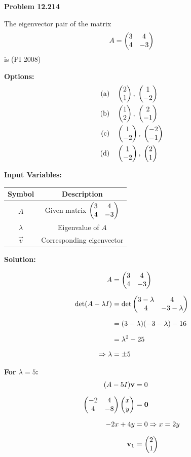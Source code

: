 \documentclass[12pt]{article}
\begin{document}
\textbf{Problem 12.214} 

The eigenvector pair of the matrix
\begin{align}
A = \begin{pmatrix}3 & 4 \\ 4 & -3\end{pmatrix}
\end{align}
is (PI 2008)

\textbf{Options:}
\begin{align}
\text{(a)} \quad & \begin{pmatrix}2 \\ 1\end{pmatrix}, \; \begin{pmatrix}1 \\ -2\end{pmatrix} \\
\text{(b)} \quad & \begin{pmatrix}1 \\ 2\end{pmatrix}, \; \begin{pmatrix}2 \\ -1\end{pmatrix} \\
\text{(c)} \quad & \begin{pmatrix}1 \\ -2\end{pmatrix}, \; \begin{pmatrix}-2 \\ -1\end{pmatrix} \\
\text{(d)} \quad & \begin{pmatrix}1 \\ -2\end{pmatrix}, \; \begin{pmatrix}2 \\ 1\end{pmatrix}
\end{align}


\textbf{Input Variables:}

\begin{table}[H]
\centering
\begin{tabular}{|c|c|}
\hline
Symbol & Description \\
\hline
$A$ & Given matrix $\begin{pmatrix}3 & 4 \\ 4 & -3\end{pmatrix}$ \\
$\lambda$ & Eigenvalue of $A$ \\
$\vec{v}$ & Corresponding eigenvector \\
\hline
\end{tabular}
\end{table}

\textbf{Solution:}

\begin{align}
A &= \begin{pmatrix}3 & 4 \\ 4 & -3\end{pmatrix} \\[6pt]
\det(A - \lambda I) &= 
\det\begin{pmatrix}3-\lambda & 4 \\ 4 & -3-\lambda\end{pmatrix} \\[6pt]
&= (3-\lambda)(-3-\lambda) - 16 \\[6pt]
&= \lambda^2 - 25 \\[6pt]
\Rightarrow \lambda &= \pm 5
\end{align}

\textbf{For $\lambda = 5$:}
\begin{align}
(A - 5I)\mathbf{v} &= 0 \\[6pt]
\begin{pmatrix}-2 & 4 \\ 4 & -8\end{pmatrix}\begin{pmatrix}x \\ y\end{pmatrix} &= \mathbf{0} \\[6pt]
-2x + 4y &= 0 \Rightarrow x = 2y \\[6pt]
\mathbf{v_1} &= \begin{pmatrix}2 \\ 1\end{pmatrix}
\end{align}
\end{document}
